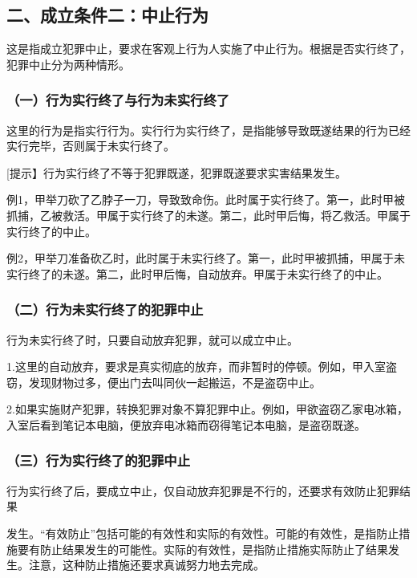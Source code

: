 \subsection*{二、成立条件二：中止行为}

这是指成立犯罪中止，要求在客观上行为人实施了中止行为。根据是否实行终了，犯罪中止分为两种情形。

\subsubsection*{（一）行为实行终了与行为未实行终了}

这里的行为是指实行行为。实行行为实行终了，是指能够导致既遂结果的行为已经实行完毕，否则属于未实行终了。

[提示】行为实行终了不等于犯罪既遂，犯罪既遂要求实害结果发生。

例1，甲举刀砍了乙脖子一刀，导致致命伤。此时属于实行终了。第一，此时甲被抓捕，乙被救活。甲属于实行终了的未遂。第二，此时甲后悔，将乙救活。甲属于实行终了的中止。

例2，甲举刀准备砍乙时，此时属于未实行终了。第一，此时甲被抓捕，甲属于未实行终了的未遂。第二，此时甲后悔，自动放弃。甲属于未实行终了的中止。

\subsubsection*{（二）行为未实行终了的犯罪中止}

行为未实行终了时，只要自动放弃犯罪，就可以成立中止。

1.这里的自动放弃，要求是真实彻底的放弃，而非暂时的停顿。例如，甲入室盗窃，发现财物过多，便出门去叫同伙一起搬运，不是盗窃中止。

2.如果实施财产犯罪，转换犯罪对象不算犯罪中止。例如，甲欲盗窃乙家电冰箱，入室后看到笔记本电脑，便放弃电冰箱而窃得笔记本电脑，是盗窃既遂。

\subsubsection*{（三）行为实行终了的犯罪中止}

行为实行终了后，要成立中止，仅自动放弃犯罪是不行的，还要求有效防止犯罪结果

发生。“有效防止”包括可能的有效性和实际的有效性。可能的有效性，是指防止措施要有防止结果发生的可能性。实际的有效性，是指防止措施实际防止了结果发生。注意，这种防止措施还要求真诚努力地去完成。

